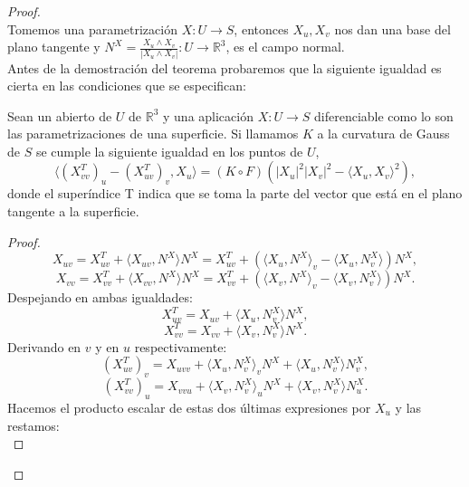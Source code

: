 \begin{proof}
${ }$\\

	Tomemos una parametrización $X : U \to S$, entonces $X_u, X_v$ nos dan una base del plano tangente y $N^X = \frac{X_u \wedge X_v}{|X_u \wedge X_v|} : U \to \mathbb{R}^3$, es el campo normal.
	${ }$\\
	
	Antes de la demostración del teorema probaremos que la siguiente igualdad es cierta en las condiciones que se especifican:
	${ }$\\
	
	\begin{lema}
		Sean un abierto de $U$ de $\mathbb{R}^3$ y una aplicación $X : U \to S$ diferenciable como lo son las parametrizaciones de una superficie. Si llamamos $K$ a la curvatura de Gauss de $S$ se cumple la siguiente igualdad en los puntos de $U$,
		\[
			\langle ({X}^{T}_{vv})_u - ({X}^{T}_{uv})_v, X_u \rangle = (K \circ F)(|X_u|^2|X_v|^2 - \langle X_u, X_v \rangle ^2),
		\]
		donde el superíndice T indica que se toma la parte del vector que está en el plano tangente a la superficie.
	\end{lema}
	\begin{proof}
		\[
			X_{uv} = {X}^{T}_{uv} + \langle X_{uv}, N^X \rangle N^X = {X}^{T}_{uv} + (\langle X_u,N^X \rangle_v - \langle X_u, N^{X}_{v} \rangle )N^X,
		\]
		\[
			X_{vv} = X^{T}_{vv} + \langle X_{vv}, N^{X} \rangle N^X = X^{T}_{vv} + (\langle X_v,N^X \rangle _v - \langle X_v, N^{X}_{v}\rangle )N^X.
		\]
		${ }$\\
		
		Despejando en ambas igualdades:
		${ }$\\
		\[
			X^{T}_{uv} = X_{uv} + \langle X_u, N^{X}_{v} \rangle N^X,
		\]
		\[
			X^{T}_{vv} = X_{vv} + \langle X_v, N^{X}_{v} \rangle N^X.
		\]
		${ }$\\
		
		Derivando en $v$ y en $u$ respectivamente:
		${ }$\\
		\[
			(X^{T}_{uv})_v = X_{uvv} + \langle X_u, N^{X}_{v} \rangle _v N^X + \langle X_u, N^{X}_{v} \rangle N^{X}_{v},
		\]
		\[
			(X^{T}_{vv})_u = X_{vvu} + \langle X_v, N^{X}_{v}\rangle _u N^X + \langle X_v, N^{X}_{v} \rangle N^{X}_{u}.
		\]
		${ }$\\
		
		Hacemos el producto escalar de estas dos últimas expresiones por $X_u$ y las restamos:
		${ }$\\
		

\end{proof}
\end{proof}
